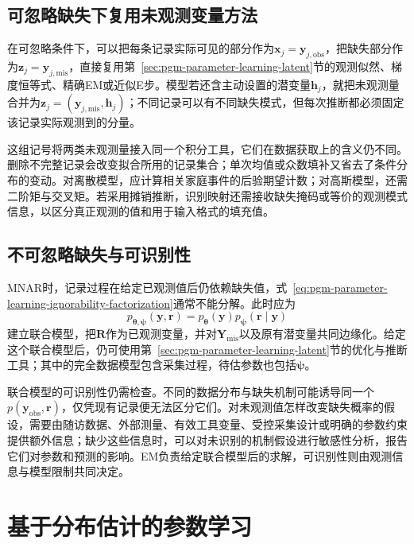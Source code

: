 \subsection{可忽略缺失下复用未观测变量方法}
\label{sec:pgm-parameter-learning-ignorable-methods}

在可忽略条件下，可以把每条记录实际可见的部分作为$\bm{x}_j=\bm{y}_{j,\mathrm{obs}}$，把缺失部分作为$\bm{z}_j=\bm{y}_{j,\mathrm{mis}}$，直接复用第~\ref{sec:pgm-parameter-learning-latent}节的观测似然、梯度恒等式、精确EM或近似E步。模型若还含主动设置的潜变量$\bm{h}_j$，就把未观测量合并为$\bm{z}_j=(\bm{y}_{j,\mathrm{mis}},\bm{h}_j)$；不同记录可以有不同缺失模式，但每次推断都必须固定该记录实际观测到的分量。

这组记号将两类未观测量接入同一个积分工具，它们在数据获取上的含义仍不同。删除不完整记录会改变拟合所用的记录集合；单次均值或众数填补又省去了条件分布的变动。对离散模型，应计算相关家庭事件的后验期望计数；对高斯模型，还需二阶矩与交叉矩。若采用摊销推断，识别映射还需接收缺失掩码或等价的观测模式信息，以区分真正观测的值和用于输入格式的填充值。

\subsection{不可忽略缺失与可识别性}
\label{sec:pgm-parameter-learning-mnar}

MNAR时，记录过程在给定已观测值后仍依赖缺失值，式~\eqref{eq:pgm-parameter-learning-ignorability-factorization}通常不能分解。此时应为
\[
  p_{\bm{\theta},\bm{\psi}}(\bm{y},\bm{r})
  =p_{\bm{\theta}}(\bm{y})
   p_{\bm{\psi}}(\bm{r}\mid\bm{y})
\]
建立联合模型，把$\bm{R}$作为已观测变量，并对$\bm{Y}_{\mathrm{mis}}$以及原有潜变量共同边缘化。给定这个联合模型后，仍可使用第~\ref{sec:pgm-parameter-learning-latent}节的优化与推断工具；其中的完全数据模型包含采集过程，待估参数也包括$\bm{\psi}$。

联合模型的可识别性仍需检查。不同的数据分布与缺失机制可能诱导同一个$p(\bm{y}_{\mathrm{obs}},\bm{r})$，仅凭现有记录便无法区分它们。对未观测值怎样改变缺失概率的假设，需要由随访数据、外部测量、有效工具变量、受控采集设计或明确的参数约束提供额外信息；缺少这些信息时，可以对未识别的机制假设进行敏感性分析，报告它们对参数和预测的影响。EM负责给定联合模型后的求解，可识别性则由观测信息与模型限制共同决定。

\section{基于分布估计的参数学习}
\label{sec:pgm-parameter-learning-bayesian}

